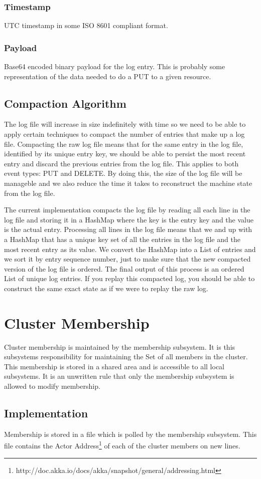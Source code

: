 \documentclass[11pt]{article}
\begin{document}
\subsubsection{Timestamp}
UTC timestamp in some ISO 8601 compliant format.

\subsubsection{Payload}
Base64 encoded binary payload for the log entry.  This is probably some representation of the data needed to do a PUT to a given resource.


\subsection{Compaction Algorithm}

The log file will increase in size indefinitely with time so we  need to be able to apply certain techniques to compact the number of entries that make up a log file. Compacting the raw log file means that for the same entry in the log file, identified by its unique entry key, we should be able to persist the most recent entry and discard the previous entries from the log file. This applies to both event types: PUT and DELETE. By doing this, the size of the log file will be manageble and we also reduce the time it takes to reconstruct the machine state from the log file.

The current implementation compacts the log file by reading all each line in the log file and storing it in a HashMap where the key is the entry key and the value is the actual entry. Processing all lines in the log file means that we and up with a HashMap that has a unique key set of all the entries in the log file and the most recent entry as its value. We convert the HashMap into a List of entries and we sort it by entry sequence number, just to make sure that the new compacted version of the log file is ordered. The final output of this process is an ordered List of unique log entries. If you replay this compacted log, you should be able to construct the same exact state as if we were to replay the raw log.

\section{Cluster Membership}
Cluster membership is maintained by the membership subsystem.  It is this subsystems responsibility for maintaining the Set of all members in the cluster.  This membership is stored in a shared area and is accessible to all local subsystems.  It is an unwritten rule that only the membership subsystem is allowed to modify membership.

\subsection{Implementation}
Membership is stored in a file which is polled by the membership subsystem. This file contains the Actor Address\footnote{http://doc.akka.io/docs/akka/snapshot/general/addressing.html} of each of the cluster members on new lines.
\end{document}
